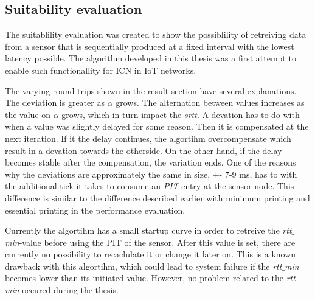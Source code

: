 \subsection{Suitability evaluation}
The suitablility evaluation was created to show the possiblility of retreiving data from a sensor that is sequentially produced at a fixed interval with the lowest latency possible. The algorithm developed in this thesis was a first attempt to enable such functionallity for ICN in IoT networks.

The varying round trips shown in the result section have several explanations. The deviation is greater as $\alpha$ grows.
The alternation between values increases as the value on $\alpha$ grows, which in turn impact the \textit{srtt}. 
A devation has to do with when a value was slightly delayed for some reason. Then it is compensated at the next iteration. If it the delay continues, the algortihm overcompensate which result in a devation towards the otherside. On the other hand, if the delay becomes stable after the compensation, the variation ends.
One of the reasons why the deviations are approximately the same in size, +- 7-9 ms, has to with the additional tick it takes to consume an \textit{PIT} entry at the sensor node. This difference is similar to the difference described earlier with minimum printing and essential printing in the performance evaluation.

Currently the algortihm has a small startup curve in order to retreive the \textit{rtt$\_$min}-value before using the PIT of the sensor. After this value is set, there are currently no possibility to recaclulate it or change it later on. This is a known drawback with this algortihm, which could lead to system failure if the \textit{rtt$\_$min} becomes lower than its initiated value. However, no problem related to the \textit{rtt$\_$min} occured during the thesis.

